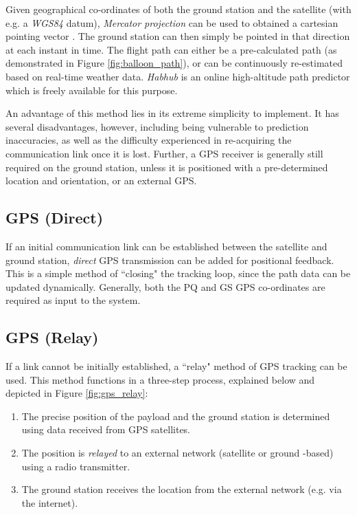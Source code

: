 Given geographical co-ordinates of both the ground station and the satellite (with e.g. a \textit{WGS84} datum), \textit{Mercator projection} can be used to obtained a cartesian pointing vector \cite{site-mercator}. The ground station can then simply be pointed in that direction at each instant in time. The flight path can either be a pre-calculated path (as demonstrated in Figure \ref{fig:balloon_path}), or can be continuously re-estimated based on real-time weather data. \textit{Habhub} is an online high-altitude path predictor \cite{site-habHub} which is freely available for this purpose.

An advantage of this method lies in its extreme simplicity to implement. It has several disadvantages, however, including being vulnerable to prediction inaccuracies, as well as the difficulty experienced in re-acquiring the communication link once it is lost. Further, a GPS receiver is generally still required on the ground station, unless it is positioned with a pre-determined location and orientation, or an external GPS.

\subsection{GPS (Direct)}
If an initial communication link can be established between the satellite and ground station, \textit{direct} GPS transmission can be added for positional feedback. This is a simple method of ``closing" the tracking loop, since the path data can be updated dynamically. Generally, both the PQ and GS GPS co-ordinates are required as input to the system.

\subsection{GPS (Relay)}
If a link cannot be initially established, a ``relay" method of GPS tracking can be used. This method functions in a three-step process, explained below and depicted in Figure \ref{fig:gps_relay}:
\begin{enumerate}
    \item The precise position of the payload and the ground station is determined using data received from GPS satellites.
    \item The position is \textit{relayed} to an external network (satellite or ground -based) using a radio transmitter.
    \item The ground station receives the location from the external network (e.g. via the internet).
\end{enumerate}

